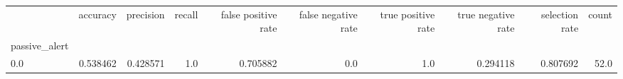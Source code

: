 \begin{tabular}{lrrrrrrrrr}
\toprule
{} &  accuracy &  precision &  recall &  false positive rate &  false negative rate &  true positive rate &  true negative rate &  selection rate &  count \\
passive\_alert &           &            &         &                      &                      &                     &                     &                 &        \\
\midrule
0.0           &  0.538462 &   0.428571 &     1.0 &             0.705882 &                  0.0 &                 1.0 &            0.294118 &        0.807692 &   52.0 \\
\bottomrule
\end{tabular}
